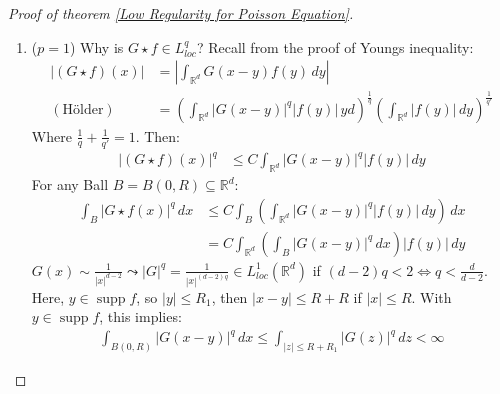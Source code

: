 \documentclass{report}
\theoremstyle{tommy}
\newcommand{\supp}{\operatorname{supp}}
\begin{document}
  \begin{proof}[Proof of theorem \ref{Low Regularity for Poisson Equation}]
    \begin{enumerate}[label=\alph*)]
      \item (\(p=1\)) Why is \(G \star f \in L_{loc}^q\)? Recall from the proof of Youngs inequality: \begin{align*}
        |(G\star f)(x)| 
        &= \left| \int_{\mathbb{R}^d} G(x-y) f(y) \, dy \right| \\
        (\text{Hölder}) \quad &= \left(\int_{\mathbb{R}^d} |G(x-y)|^q |f(y)| \, yd\right)^{\frac{1}{q}}\left(\int_{\mathbb{R}^d} |f(y)| \, dy\right)^{\frac{1}{q'}}
      \end{align*}
      Where \(\frac{1}{q} + \frac{1}{q'} = 1\). Then:
      \begin{align*}
        |(G \star f)(x)|^q 
        &\le C \int_{\mathbb{R}^d} |G(x-y)|^q |f(y)| \, dy
      \end{align*}
      For any Ball \(B = B(0, R) \subseteq \mathbb{R}^d\):
      \begin{align*}
        \int_B |G \star f(x)|^q \, dx
        &\le C \int_B \left(\int_{\mathbb{R}^d} |G(x-y)|^q |f(y)| \, dy\right) \, dx \\
        &= C \int_{\mathbb{R}^d} \left(\int_B |G(x-y)|^q \, dx \right) |f(y)| \, dy
      \end{align*}
      \(G(x) \sim \frac{1}{|x|^{d-2}} \leadsto |G|^{q} = \frac{1}{|x|^{(d-2)q}} \in L_{loc}^1(\mathbb{R}^d)\) if \((d-2)q < 2 \Leftrightarrow q < \frac{d}{d-2}\). Here, \(y \in \supp f \), so \(|y| \le R_1\), then \(|x-y| \le R + R\) if \(|x| \le R\). With \(y \in \supp f\), this implies:
      \begin{align*}
        \int_{B(0,R)}|G(x-y)|^q \, dx \le \int_{|z| \le R + R_1} |G(z)|^q \, dz < \infty
      \end{align*}


\end{enumerate}
\end{proof}
\end{document}
